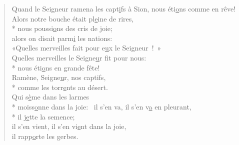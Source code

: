 \begin{verse}

Quand le Seigneur ramena les capt\underline{i}fs à Sion,\psalmstar
nous éti\underline{o}ns comme en rêve! \\

Alors notre bouche était pl\underline{e}ine de rires, \\*
nous poussi\underline{o}ns des cris de joie; \\
alors on disait parm\underline{i} les nations: \\
«Quelles merveilles fait pour e\underline{u}x le Seigneur ! » \\
Quelles merveilles le Seigne\underline{u}r fit pour nous: \\*
nous éti\underline{o}ns en grande fête! \\

Ramène, Seigne\underline{u}r, nos captifs, \\*
comme les torr\underline{e}nts au désert. \\

Qui s\underline{è}me dans les larmes \\*
moiss\underline{o}nne dans la joie:~\psalmdagger
{}il s’en va, il s’en v\underline{a} en pleurant, \\*
il j\underline{e}tte la semence; \\
il s’en vient, il s’en vi\underline{e}nt dans la joie, \\
il rapp\underline{o}rte les gerbes. \\
\end{verse}

